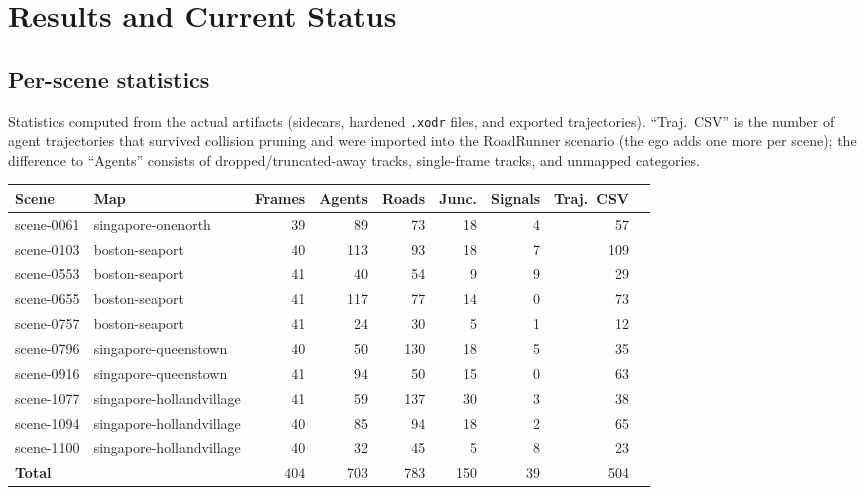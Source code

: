 \documentclass[11pt]{article}
\newcommand{\file}[1]{\texttt{#1}}
\begin{document}
\section{Results and Current Status}
\label{sec:results}

\subsection{Per-scene statistics}
Statistics computed from the actual artifacts (sidecars, hardened \file{.xodr} files,
and exported trajectories). ``Traj.\ CSV'' is the number of agent trajectories that
survived collision pruning and were imported into the RoadRunner scenario (the ego adds
one more per scene); the difference to ``Agents'' consists of dropped/truncated-away
tracks, single-frame tracks, and unmapped categories.

\begin{center}
\footnotesize
\begin{tabular}{@{}llrrrrrrr@{}}
\toprule
\textbf{Scene} & \textbf{Map} & \textbf{Frames} & \textbf{Agents} & \textbf{Roads} & \textbf{Junc.} & \textbf{Signals} & \textbf{Traj.\ CSV} \\
\midrule
scene-0061 & singapore-onenorth       & 39 &  89 &  73 & 18 & 4 &  57 \\
scene-0103 & boston-seaport           & 40 & 113 &  93 & 18 & 7 & 109 \\
scene-0553 & boston-seaport           & 41 &  40 &  54 &  9 & 9 &  29 \\
scene-0655 & boston-seaport           & 41 & 117 &  77 & 14 & 0 &  73 \\
scene-0757 & boston-seaport           & 41 &  24 &  30 &  5 & 1 &  12 \\
scene-0796 & singapore-queenstown     & 40 &  50 & 130 & 18 & 5 &  35 \\
scene-0916 & singapore-queenstown     & 41 &  94 &  50 & 15 & 0 &  63 \\
scene-1077 & singapore-hollandvillage & 41 &  59 & 137 & 30 & 3 &  38 \\
scene-1094 & singapore-hollandvillage & 40 &  85 &  94 & 18 & 2 &  65 \\
scene-1100 & singapore-hollandvillage & 40 &  32 &  45 &  5 & 8 &  23 \\
\midrule
\textbf{Total} & & 404 & 703 & 783 & 150 & 39 & 504 \\
\bottomrule
\end{tabular}
\end{center}
\end{document}
